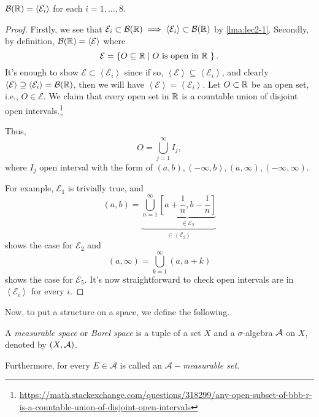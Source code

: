 \begin{proposition}
	\(\mathcal{B} (\mathbb{\MakeUppercase{R}} ) = \left<\mathcal{E}_{i}\right> \) for each \(i = 1, \ldots, 8\).
\end{proposition}
\begin{proof}
	Firstly, we see that \(\mathcal{E} _{i}\subset \mathcal{B} (\mathbb{\MakeUppercase{R}} ) \implies \left<\mathcal{E} _{i}\right>\subset \mathcal{B} (\mathbb{\MakeUppercase{R}} )\) by \autoref{lma:lec2-1}.
	Secondly, by definition, \(\mathcal{B} (\mathbb{\MakeUppercase{R}} ) = \left<\mathcal{E} \right>\) where
	\[
		\mathcal{E} = \left\{O\subseteq \mathbb{\MakeUppercase{R}}\mid O \text{ is open in \(\mathbb{\MakeUppercase{R}}\) } \right\}.
	\]
	It's enough to show \(\mathcal{E} \subset \left<\mathcal{E} _{i}\right>\) since if so, \(\left<\mathcal{E} \right>\subseteq \left<\mathcal{E} _{i}\right>\), and clearly
	\(\left< \mathcal{E}  \right> \supseteq \left< \mathcal{E}_{i} \right> = \mathcal{B} (\mathbb{\MakeUppercase{R}}) \), then we will have
	\(\left< \mathcal{E}\right> = \left< \mathcal{E} _{i} \right> \). Let \(O\subset \mathbb{\MakeUppercase{R}} \) be an open set, i.e., \(O\in\mathcal{E}\).
	We claim that every open set in \(\mathbb{\MakeUppercase{R}} \) is a countable union of disjoint open intervals.\footnote{\url{https://math.stackexchange.com/questions/318299/any-open-subset-of-bbb-r-is-a-countable-union-of-disjoint-open-intervals}}

	Thus,
	\[
		O = \bigcup\limits_{j=1}^{\infty} I_{j},
	\]
	where \(I_{j}\) open interval with the form of \((a, b), (-\infty, b), (a, \infty), (-\infty, \infty)\).

	For example, \(\mathcal{E} _1\) is trivially true, and
	\[
		(a, b) = \underbrace{\bigcup\limits_{n=1}^{\infty} \underbrace{[a+\frac{1}{n}, b-\frac{1}{n}]}_{\in \mathcal{E}_2}}_{\in\left<\mathcal{E} _2\right>}
	\]
	shows the case for \(\mathcal{E} _2\) and
	\[
		(a, \infty) = \bigcup\limits_{k=1}^{\infty} (a, a+k)
	\]
	shows the case for \(\mathcal{E} _5\). It's now straightforward to check open intervals are in \(\left<\mathcal{E} _{i}\right>\) for every \(i\).
\end{proof}

Now, to put a structure on a space, we define the following.
\begin{definition}\label{def:measurable-space}\label{def:A-measurable-set}
	A \emph{measurable space} or \emph{Borel space} is a tuple of a set \(X\) and a \(\sigma\)-algebra \(\mathcal{\MakeUppercase{a}} \) on \(X\),
	denoted by \((X, \mathcal{\MakeUppercase{a}} )\).

	\par Furthermore, for every \(E\in \mathcal{A} \) is called an \emph{\(\mathcal{A}-\)measurable set}.
\end{definition}

